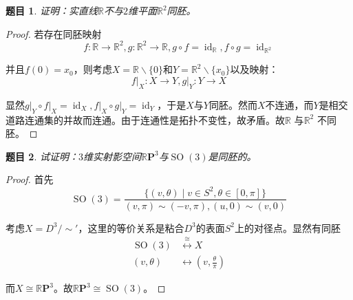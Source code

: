 \documentclass[UTF-8,11pt,fancyhdr,hyperref,titlepage]{ctexart}
\theoremstyle{question}
\newtheorem{timu}{题目}
\theoremstyle{theorem}
\theoremstyle{definition}
\theoremstyle{remark}
\def\RR{{\mathbb R}}
\def\RP{\mathbb{R}\mathbf{P}}
\def\longto{\longrightarrow}
\def\To{\longto}
\newcommand{\local}[2]{\left.{#1}\right|_{#2}}
\DeclareMathOperator{\id}{id}
\DeclareMathOperator{\SO}{SO}
\begin{document}
\begin{timu}\label{3}
  证明：实直线$\RR$不与$2$维平面$\RR^2$同胚。
\end{timu}
\begin{proof}
  若存在同胚映射
  \begin{equation*}
    f\colon\RR\To\RR^2, g\colon\RR^2\To\RR, g\circ f=\id_{\RR}, f\circ g=\id_{\RR^2}
  \end{equation*}
  
  并且$f(0)=x_0$，则考虑$X=\RR\backslash\{0\}$和$Y=\RR^2\backslash\{x_0\}$以及映射：
  \begin{equation*}
    \local{f}{X}\colon X\To Y, \local{g}{Y}\colon Y\To X
  \end{equation*}

  显然$\local{g}{Y}\circ\local{f}{X}=\id_{X}, \local{f}{X}\circ\local{g}{Y}=\id_{Y}$，于是$X$与$Y$同胚。然而$X$不连通，而$Y$是相交道路连通集的并故而连通。由于连通性是拓扑不变性，故矛盾。故$\RR$ 与$\RR^2$ 不同胚。
\end{proof}

\begin{timu}\label{4}
  试证明：$3$维实射影空间$\RP^3$与$\SO(3)$是同胚的。
\end{timu}
\begin{proof}
  首先
  \begin{equation*}
    \SO(3)=\frac{\{(v,\theta)\mid v\in S^2, \theta\in[0,\pi]\}}{(v,\pi)\sim(-v,\pi), (u,0)\sim(v,0)}
  \end{equation*}
  
  考虑$X=D^3/\sim'$，这里的等价关系是粘合$D^3$的表面$S^2$上的对径点。显然有同胚
  \begin{align*}
    \SO(3) &\stackrel{\cong}{\longleftrightarrow} X \\
    (v,\theta) &\longleftrightarrow (v,\frac{\theta}{\pi})
  \end{align*}
  
  而$X\cong\RP^3$。故$\RP^3\cong\SO(3)$。
\end{proof}
\end{document}
